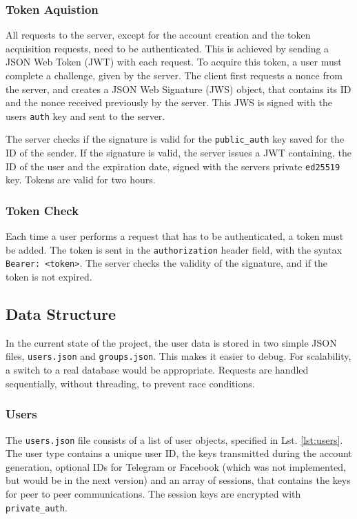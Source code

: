 \documentclass[a4paper, oneside]{discothesis}
\begin{document}
\subsubsection{Token Aquistion}

All requests to the server, except for the account creation and the token acquisition requests, need to be authenticated. This is achieved by sending a JSON Web Token (JWT) with each request. To acquire this token, a user must complete a challenge, given by the server. The client first requests a nonce from the server, and creates a JSON Web Signature (JWS) object, that contains its ID and the nonce received previously by the server. This JWS is signed with the users \texttt{auth} key and sent to the server.

The server checks if the signature is valid for the \texttt{public\_auth} key saved for the ID of the sender. If the signature is valid, the server issues a JWT containing, the ID of the user and the expiration date, signed with the servers private \texttt{ed25519} key. Tokens are valid for two hours.

\subsubsection{Token Check}

Each time a user performs a request that has to be authenticated, a token must be added. The token is sent in the \texttt{authorization} header field, with the syntax \texttt{Bearer: <token>}. The server checks the validity of the signature, and if the token is not expired.

\subsection{Data Structure}

In the current state of the project, the user data is stored in two simple JSON files, \texttt{users.json} and \texttt{groups.json}. This makes it easier to debug. For scalability, a switch to a real database would be appropriate. Requests are handled sequentially, without threading, to prevent race conditions.

\subsubsection{Users}

The \texttt{users.json} file consists of a list of user objects, specified in Lst. \ref{lst:users}. The user type contains a unique user ID, the keys transmitted during the account generation, optional IDs for Telegram or Facebook (which was not implemented, but would be in the next version) and an array of sessions, that contains the keys for peer to peer communications. The session keys are encrypted with \texttt{private\_auth}.
\end{document}
